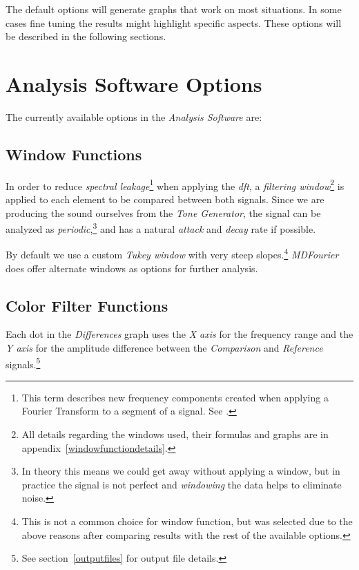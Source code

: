 \documentclass[10pt,a4paper]{report}
\newcommand{\ac}[1]{\textit{\mbox{\acrshort{#1}}}}
\begin{document}
\begin{appendices}
The default options will generate graphs that work on most situations. In some cases fine tuning the results might highlight specific aspects. These options will be described in the following sections.

\section{Analysis Software Options}

The currently available options in the \textit{Analysis Software} are:

\subsection{Window Functions}
\label{windows}

In order to reduce \textit{spectral leakage}\footnote{This term describes new frequency components created when applying a Fourier Transform to a segment of a signal. See \cite{leakage}.} when applying the \ac{dft}, a \textit{filtering window}\footnote{All details regarding the windows used, their formulas and graphs are in appendix~\ref{windowfunctiondetails}.} is applied to each element to be compared between both signals. Since we are producing the sound ourselves from the \textit{Tone Generator}, the signal can be analyzed as \textit{periodic},\footnote{In theory this means we could get away without applying a window, but in practice the signal is not perfect and \textit{windowing} the data helps to eliminate noise.} and has a natural \textit{attack} and \textit{decay} rate if possible.

By default we use a custom \textit{Tukey window} with very steep slopes.\footnote{This is not a common choice for window function, but was selected due to the above reasons after comparing results with  the rest of the available options.} \textit{MDFourier} does offer alternate windows as options for further analysis.

\subsection{Color Filter Functions}
\label{colorfilter}

Each dot in the \textit{Differences} graph uses the \textit{X axis} for the frequency range and the \textit{Y axis} for the amplitude difference between the \textit{Comparison} and \textit{Reference} signals.\footnote{See section~\ref{outputfiles} for output file details.}


\end{appendices}
\end{document}
